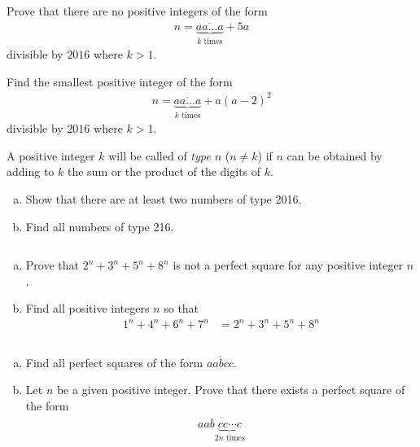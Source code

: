\documentclass[problems.tex]{subfile}
\begin{document}
	\begin{problem}
		Prove that there are no positive integers of the form
			\begin{align*}
				n = \underbrace{\overline{aa\dots a}}_{k\text{ times}} + 5a
			\end{align*}
		divisible by $2016$ where $k>1$.
	\end{problem}

	\begin{problem}
		Find the smallest positive integer of the form
			\begin{align*}
				n = \underbrace{\overline{aa\dots a}}_{k\text{ times}} + a(a-2)^2
			\end{align*}
		divisible by $2016$ where $k>1$.
	\end{problem}

	\begin{problem}
		A positive integer $k$ will be called of \textit{type $n$} ($n \neq k$) if $n$ can be obtained by adding to $k$ the sum or the product of the digits of $k$.
		\begin{enumerate}[(a)]
			\item Show that there are at least two numbers of type 2016.
			\item  Find all numbers of type 216.
		\end{enumerate}
	\end{problem}

	\begin{problem}
		$ $
		\begin{enumerate}[(a)]
			\item Prove that $2^n+3^n+5^n+8^n$ is not a perfect square for any positive integer $n$.
			\item Find all positive integers $n$ so that
				\begin{align*}
					1^n + 4^n + 6^n + 7^n
						& = 2^n + 3^n + 5^n + 8^n
				\end{align*}
		\end{enumerate}
	\end{problem}

	\begin{problem}
		$ $
		\begin{enumerate}[(a)]
			\item Find all perfect squares of the form $\overline{aabcc}$.
			\item Let $n$ be a given positive integer. Prove that there exists a perfect square of the form
				\begin{align*}
					\overline{aab\underbrace{cc\cdots c}_{2n\text{ times}}}
				\end{align*}
		\end{enumerate}
	\end{problem}
\end{document}
